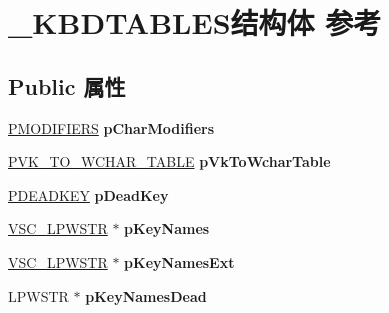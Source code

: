 \hypertarget{struct___k_b_d_t_a_b_l_e_s}{}\section{\+\_\+\+K\+B\+D\+T\+A\+B\+L\+E\+S结构体 参考}
\label{struct___k_b_d_t_a_b_l_e_s}
\subsection*{Public 属性}
\begin{DoxyCompactItemize}
\item 
\mbox{\label{struct___k_b_d_t_a_b_l_e_s_a2d77427db285ac6847e0b3b5d1072964}} 
\hyperlink{struct___m_o_d_i_f_i_e_r_s}{P\+M\+O\+D\+I\+F\+I\+E\+RS} {\bfseries p\+Char\+Modifiers}
\item 
\mbox{\label{struct___k_b_d_t_a_b_l_e_s_a5f223f1331196f80972065b580be92ca}} 
\hyperlink{struct___v_k___t_o___w_c_h_a_r___t_a_b_l_e}{P\+V\+K\+\_\+\+T\+O\+\_\+\+W\+C\+H\+A\+R\+\_\+\+T\+A\+B\+LE} {\bfseries p\+Vk\+To\+Wchar\+Table}
\item 
\mbox{\label{struct___k_b_d_t_a_b_l_e_s_a9e525ddb0550851e0935a42896442f9f}} 
\hyperlink{struct___d_e_a_d_k_e_y}{P\+D\+E\+A\+D\+K\+EY} {\bfseries p\+Dead\+Key}
\item 
\mbox{\label{struct___k_b_d_t_a_b_l_e_s_aba5e1618cb81e9b21fd2b41e09e30d21}} 
\hyperlink{struct___v_s_c___l_p_w_s_t_r}{V\+S\+C\+\_\+\+L\+P\+W\+S\+TR} $\ast$ {\bfseries p\+Key\+Names}
\item 
\mbox{\label{struct___k_b_d_t_a_b_l_e_s_a21dc15de5ae5cfb4bc8c28ff35ae16cc}} 
\hyperlink{struct___v_s_c___l_p_w_s_t_r}{V\+S\+C\+\_\+\+L\+P\+W\+S\+TR} $\ast$ {\bfseries p\+Key\+Names\+Ext}
\item 
\mbox{\label{struct___k_b_d_t_a_b_l_e_s_aa0c0a2af91e3d46fbaf5d32be6aa0726}} 
L\+P\+W\+S\+TR $\ast$ {\bfseries p\+Key\+Names\+Dead}
\item 
\mbox{\label{struct___k_b_d_t_a_b_l_e_s_a9103432aa75a0d4ecd577c2a917cc2ed}} 

\end{DoxyCompactItemize}
